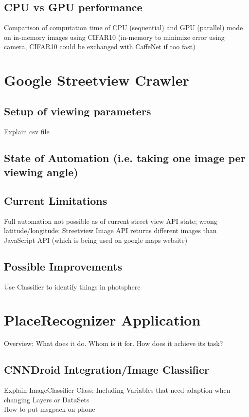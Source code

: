 \documentclass[a4paper,12pt,pagesize,headsepline,bibtotoc,titlepage]{scrartcl}
\begin{document}
\subsection{CPU vs GPU performance}
Comparison of computation time of CPU (sequential) and GPU (parallel) mode on in-memory images using CIFAR10 (in-memory to minimize error using camera, CIFAR10 could be exchanged with CaffeNet if too fast)

\newpage
\section{Google Streetview Crawler}
\subsection{Setup of viewing parameters}
Explain csv file

\subsection{State of Automation (i.e. taking one image per viewing angle)}

\subsection{Current Limitations}
Full automation not possible as of current street view API state; wrong latitude/longitude; Streetview Image API returns different images than JavaScript API (which is being used on google maps website)

\subsection{Possible Improvements}
Use Classifier to identify things in photsphere


\newpage
\section {PlaceRecognizer Application}
Overview: What does it do. Whom is it for. How does it achieve its task?

\subsection {CNNDroid Integration/Image Classifier}
Explain ImageClassifier Class; Including Variables that need adaption when changing Layers or DataSets\\
How to put msgpack on phone
\end{document}
